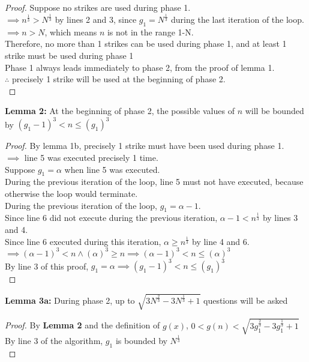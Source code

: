 \begin{problem}
\begin{proof}
    Suppose no strikes are used during phase 1. \\
    $\implies n^{\frac{1}{3}} > N^{\frac{1}{3}}$ by lines 2 and 3, since $g_1 = N^{\frac{1}{3}}$ during the last iteration of the loop. \\
    $\implies n > N$, which means $n$ is not in the range 1-N. \\
    Therefore, no more than 1 strikes can be used during phase 1, and at least 1 strike must be used during phase 1 \\
    Phase 1 always leads immediately to phase 2, from the proof of lemma 1. \\
    $\therefore $ precisely 1 strike will be used at the beginning of phase 2. \\
  \end{proof}
  \textbf{Lemma 2:} At the beginning of phase 2, the possible values of $n$ will be bounded by $(g_1 - 1)^3 < n \leq (g_1)^3$ \\
  \begin{proof}
    By lemma 1b, precisely 1 strike must have been used during phase 1. \\
    $\implies $ line 5 was executed precisely 1 time. \\
    Suppose $g_1 = \alpha$ when line 5 was executed. \\
    During the previous iteration of the loop, line 5 must not have executed, because otherwise the loop would terminate. \\
    During the previous iteration of the loop, $g_1 = \alpha - 1$. \\
    Since line 6 did not execute during the previous iteration, $\alpha - 1 < n^{\frac{1}{3}}$ by lines 3 and 4. \\
    Since line 6 executed during this iteration, $\alpha \geq n^{\frac{1}{3}}$ by line 4 and 6. \\
    $\implies (\alpha - 1)^3 < n \land (\alpha)^3 \geq n \implies (\alpha - 1)^3 < n \leq (\alpha)^3$ \\
    By line 3 of this proof, $g_1 = \alpha \implies (g_1 - 1)^3 < n \leq (g_1)^3$ \\
  \end{proof}
  \textbf{Lemma 3a:} During phase 2, up to $\sqrt{3N^{\frac{2}{3}} - 3N^{\frac{1}{3}} + 1}$ questions will be asked
  \begin{proof}
    By \textbf{Lemma 2} and the definition of $g(x)$, $ 0 < g(n) < \sqrt{3g_1^{\frac{2}{3}} - 3g_1^{\frac{1}{3}} + 1}$ \\
    By line 3 of the algorithm, $g_1$ is bounded by $N^{\frac{1}{3}}$ \\

\end{proof}
\end{problem}
